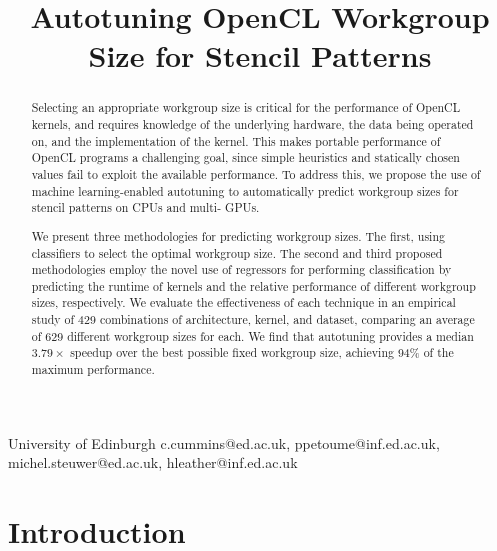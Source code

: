 \documentclass[preprint,nonatbib,10pt,nocopyrightspace]{sigplanconf}
\begin{document}
\setlength{\pdfpageheight}{\paperheight}
\setlength{\pdfpagewidth}{\paperwidth}


\title{Autotuning OpenCL Workgroup Size for Stencil Patterns}

           {University of Edinburgh}
           {c.cummins@ed.ac.uk, ppetoume@inf.ed.ac.uk, michel.steuwer@ed.ac.uk, hleather@inf.ed.ac.uk}

\maketitle

\begin{abstract}
  Selecting an appropriate workgroup size is critical for the performance of
  OpenCL kernels, and requires knowledge of the underlying hardware, the data
  being operated on, and the implementation of the kernel. This makes portable
  performance of OpenCL programs a challenging goal, since simple heuristics and
  statically chosen values fail to exploit the available performance. To address
  this, we propose the use of machine learning-enabled autotuning to
  automatically predict workgroup sizes for stencil patterns on CPUs and multi-
  GPUs.

  We present three methodologies for predicting workgroup sizes. The first,
  using classifiers to select the optimal workgroup size. The second and third
  proposed methodologies employ the novel use of regressors for performing
  classification by predicting the runtime of kernels and the relative
  performance of different workgroup sizes, respectively. We evaluate the
  effectiveness of each technique in an empirical study of 429 combinations of
  architecture, kernel, and dataset, comparing an average of 629 different
  workgroup sizes for each. We find that autotuning provides a median
  $3.79\times$ speedup over the best possible fixed workgroup size, achieving
  94\% of the maximum performance.
\end{abstract}

\section{Introduction}\label{sec:introduction}
\end{document}
